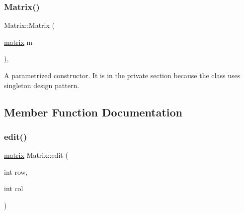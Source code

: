 \subsubsection{\texorpdfstring{Matrix()}{Matrix()}\hspace{0.1cm}{\footnotesize\ttfamily [2/2]}}
{\footnotesize\ttfamily Matrix\+::\+Matrix (\begin{DoxyParamCaption}\item[{\hyperlink{formula_8h_a869e2a5deeb3daa4c82d6bc91cf20d92}{matrix}}]{m }\end{DoxyParamCaption})\hspace{0.3cm}{\ttfamily [inline]}, {\ttfamily [private]}}

A parametrized constructor. It is in the private section because the class uses singleton design pattern. 

\subsection{Member Function Documentation}
\mbox{\label{class_matrix_a34b2269a2b6d06c202439de2e64009ba}} 
\subsubsection{\texorpdfstring{edit()}{edit()}}
{\footnotesize\ttfamily \hyperlink{formula_8h_a869e2a5deeb3daa4c82d6bc91cf20d92}{matrix} Matrix\+::edit (\begin{DoxyParamCaption}\item[{int}]{row,  }\item[{int}]{col }\end{DoxyParamCaption})}

